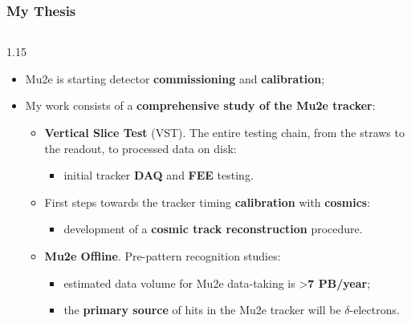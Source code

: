 \documentclass{beamer}
\begin{document}
\begin{frame}
    \frametitle{My Thesis}
    
\begin{columns}
   \begin{column}{1.15\framewidth} 
         \setlength{\leftmargini}{1.3em}
\vspace{-4mm}
\begin{itemize}
\item Mu2e is starting detector \textbf{commissioning} and \textbf{calibration};
     \vspace{4mm}
\item My work consists of a \textbf{comprehensive study of the Mu2e tracker}:
\vspace{3mm}
  \begin{itemize}
    \item \textbf{Vertical Slice Test} (VST). The entire 
testing chain, from the straws to the readout, to processed data on disk:
     \vspace{2mm}
 \begin{itemize}
     \item initial tracker \textbf{DAQ} and \textbf{FEE} testing.
     \end{itemize}
     \vspace{3mm}

    \item First steps towards the tracker timing \textbf{calibration} with \textbf{cosmics}:
         \vspace{2mm}
    \begin{itemize}
            \item development of a \textbf{cosmic track reconstruction} procedure.
    \end{itemize}
         \vspace{3mm}

    \item \textbf{Mu2e Offline}. Pre-pattern recognition studies:
         \vspace{2mm}
    \begin{itemize}
        \item estimated data volume for Mu2e data-taking 
is >\textbf{7 PB/year};
     \vspace{1.5mm}
\item the \textbf{primary source} of hits in the 
Mu2e tracker will be $\delta$-electrons.
    \end{itemize}
        \end{itemize}
\end{itemize}
 \end{column}
 \end{columns}
     

\end{frame}
\end{document}
